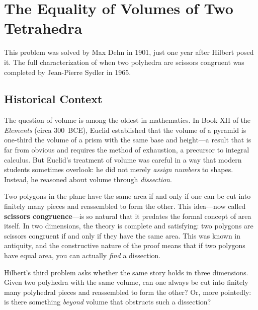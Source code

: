 
\chapter{The Equality of Volumes of Two Tetrahedra}

\begin{solvedbox}
This problem was solved by Max Dehn in 1901, just one year after Hilbert posed it. The full characterization of when two polyhedra are scissors congruent was completed by Jean-Pierre Sydler in 1965.
\end{solvedbox}

\section{Historical Context}

The question of volume is among the oldest in mathematics. In Book XII of the \emph{Elements} (circa 300~BCE), Euclid established that the volume of a pyramid is one-third the volume of a prism with the same base and height---a result that is far from obvious and requires the method of exhaustion, a precursor to integral calculus. But Euclid's treatment of volume was careful in a way that modern students sometimes overlook: he did not merely \emph{assign numbers} to shapes. Instead, he reasoned about volume through \emph{dissection}.

Two polygons in the plane have the same area if and only if one can be cut into finitely many pieces and reassembled to form the other. This idea---now called \textbf{scissors congruence}---is so natural that it predates the formal concept of area itself. In two dimensions, the theory is complete and satisfying: two polygons are scissors congruent if and only if they have the same area. This was known in antiquity, and the constructive nature of the proof means that if two polygons have equal area, you can actually \emph{find} a dissection.

Hilbert's third problem asks whether the same story holds in three dimensions. Given two polyhedra with the same volume, can one always be cut into finitely many polyhedral pieces and reassembled to form the other? Or, more pointedly: is there something \emph{beyond} volume that obstructs such a dissection?

